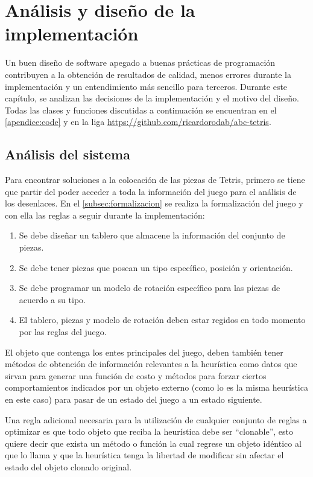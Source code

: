 \chapter{Análisis y diseño de la implementación}

Un buen diseño de software 
apegado a buenas prácticas de programación contribuyen a la obtención 
de resultados de calidad, menos errores durante la implementación y un 
entendimiento más sencillo para terceros. Durante este capítulo, se analizan  
las decisiones de la implementación y el motivo del diseño. Todas las clases y 
funciones discutidas a continuación se encuentran en el 
\cref{apendice:code} y en la liga 
\url{https://github.com/ricardorodab/abc-tetris}.

\section{Análisis del sistema}

Para encontrar soluciones a la colocación de las piezas de Tetris, primero se tiene que 
partir del poder acceder a toda la información del juego para el análisis de los desenlaces. 
En el \cref{subsec:formalizacion} se realiza la formalización del juego y con ella las 
reglas a seguir durante la implementación:

\begin{enumerate}
\item Se debe diseñar un tablero que almacene la información del conjunto de 
piezas.

\item Se debe tener piezas que posean un tipo específico, posición y orientación. 

\item Se debe programar un modelo de rotación específico para las piezas de 
acuerdo a su tipo.

\item El tablero, piezas y modelo de rotación deben estar regidos en todo 
momento por las reglas del juego.
\end{enumerate} 

El objeto que contenga los entes principales del juego, deben también tener 
métodos de obtención de información relevantes a la heurística como datos que 
sirvan para generar una función de costo y métodos para forzar ciertos 
comportamientos indicados por un objeto externo (como lo es la misma heurística 
en este caso) para pasar de un estado del juego a un estado siguiente.

Una regla adicional necesaria para la utilización de cualquier conjunto de reglas 
a optimizar es que todo objeto que reciba la heurística debe ser ``clonable'', 
esto quiere decir que exista un método o función la cual regrese un objeto idéntico 
al que lo llama y que la heurística tenga la libertad de modificar sin afectar el 
estado del objeto clonado original.

